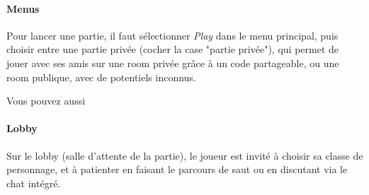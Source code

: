 \paragraph{Menus}

    Pour lancer une partie, il faut sélectionner \textit{Play} dans le menu principal, puis choisir 
    entre une partie privée (cocher la case "partie privée"), qui permet de jouer avec ses amis sur une 
    room privée grâce à un code partageable, ou une room publique, avec de potentiels inconnus.

    Vous pouvez aussi 

\paragraph{Lobby}

    Sur le lobby (salle d'attente de la partie), le joueur est invité à choisir sa classe de personnage, et à 
    patienter en faisant le parcours de saut ou en discutant via le chat intégré.

    